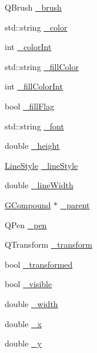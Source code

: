\begin{DoxyCompactItemize}
\item 
Q\+Brush \mbox{\hyperlink{classGObject_aab24462ec896b596d99911767b0912d0}{\+\_\+brush}}
\item 
std\+::string \mbox{\hyperlink{classGObject_a1134e770ae4315ea8bc1201e2f21da8b}{\+\_\+color}}
\item 
int \mbox{\hyperlink{classGObject_a003fdd343d9b7505c53a8b7a134200ed}{\+\_\+color\+Int}}
\item 
std\+::string \mbox{\hyperlink{classGObject_a179f8d6cee65cd8a54692e32b224392a}{\+\_\+fill\+Color}}
\item 
int \mbox{\hyperlink{classGObject_a751def333a67d651e5b99cc331ecb496}{\+\_\+fill\+Color\+Int}}
\item 
bool \mbox{\hyperlink{classGObject_ad4a55cbcd61b58a4d49666490bb2f103}{\+\_\+fill\+Flag}}
\item 
std\+::string \mbox{\hyperlink{classGObject_aea76ea1a8b5dd7b0a78653277e63b536}{\+\_\+font}}
\item 
double \mbox{\hyperlink{classGObject_ad05df29e7f27fc504abd743e3d8b4e73}{\+\_\+height}}
\item 
\mbox{\hyperlink{classGObject_a86e0f5648542856159bb40775c854aa7}{Line\+Style}} \mbox{\hyperlink{classGObject_a89bafecaafb7c72d55c7efc10b7d0523}{\+\_\+line\+Style}}
\item 
double \mbox{\hyperlink{classGObject_a16e9033665937f13de2e163dc2184aff}{\+\_\+line\+Width}}
\item 
\mbox{\hyperlink{classGCompound}{G\+Compound}} $\ast$ \mbox{\hyperlink{classGObject_ac9452c1eaff70eebddbb318196aa3835}{\+\_\+parent}}
\item 
Q\+Pen \mbox{\hyperlink{classGObject_afb69d172743f868299847174eb1b6bc8}{\+\_\+pen}}
\item 
Q\+Transform \mbox{\hyperlink{classGObject_a475b8860a5f1adb4a1fdc58d1f5c1e32}{\+\_\+transform}}
\item 
bool \mbox{\hyperlink{classGObject_ae4725802fc8d8aaa0ab4bd4781f7e07c}{\+\_\+transformed}}
\item 
bool \mbox{\hyperlink{classGObject_a9312c72508471b7c7a87b540263e1af4}{\+\_\+visible}}
\item 
double \mbox{\hyperlink{classGObject_ab55d85a3371770e6725b1062cf160cd8}{\+\_\+width}}
\item 
double \mbox{\hyperlink{classGObject_a6675b83b27137b8d3aa2ad8133078ea6}{\+\_\+x}}
\item 
double \mbox{\hyperlink{classGObject_a2f0f6aeafddc8a39c578bfa7e22b5f1e}{\+\_\+y}}
\end{DoxyCompactItemize}
